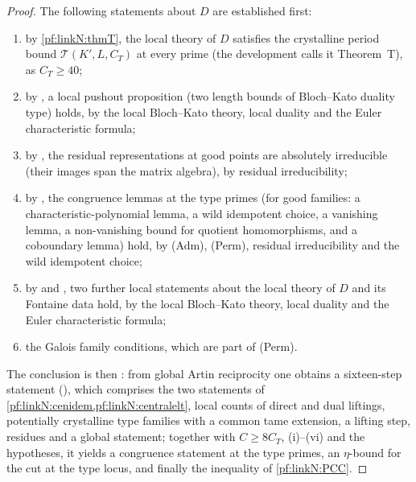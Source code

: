 \begin{proof}
The following statements about $D$ are established first:
\begin{enumerate}[label=(\roman*)]
\item by \cref{pf:linkN:thmT}, the local theory of $D$ satisfies the crystalline period bound $\mathcal T(K',L,C_T)$ at every
prime (the development calls it Theorem~T), as $C_T\ge40$;
\item by , a local pushout proposition (two length bounds of
Bloch--Kato duality type) holds, by the local Bloch--Kato theory, local duality and the Euler characteristic formula;
\item by , the residual representations at good points
are absolutely irreducible (their images span the matrix algebra), by residual irreducibility;
\item by , the congruence lemmas at the type primes (for good families: a
characteristic-polynomial lemma, a wild idempotent choice, a vanishing lemma, a non-vanishing bound for quotient homomorphisms,
and a coboundary lemma) hold, by (Adm), (Perm), residual irreducibility and the wild idempotent choice;
\item by  and
, two further local statements about the local theory of $D$
and its Fontaine data hold, by the local Bloch--Kato theory, local duality and the Euler characteristic formula;
\item the Galois family conditions, which are part of (Perm).
\end{enumerate}
The conclusion is then : from global Artin reciprocity
one obtains a sixteen-step statement (), which comprises the two
statements of \cref{pf:linkN:cenidem,pf:linkN:centralelt}, local counts of direct and dual liftings, potentially crystalline type
families with a common tame extension, a lifting step, residues and a global statement; together with $C\ge8C_T$, (i)--(vi) and the
hypotheses, it yields a congruence statement at the type primes, an $\eta$-bound for the cut at the type locus, and finally the
inequality of \cref{pf:linkN:PCC}.
\end{proof}

